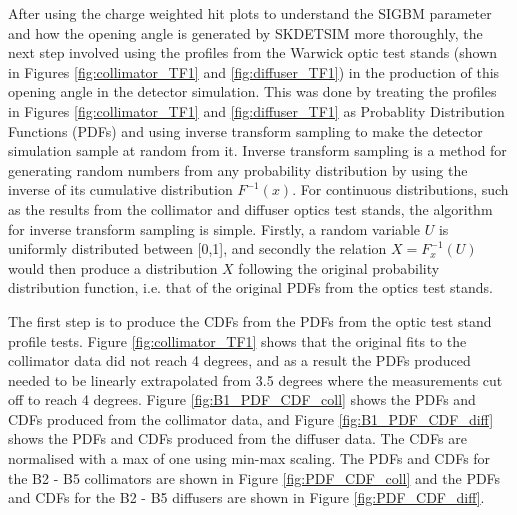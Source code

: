 After using the charge weighted hit plots to understand the SIGBM parameter and how the opening angle is generated by SKDETSIM more thoroughly, the next step involved using the profiles from the Warwick optic test stands (shown in Figures \ref{fig:collimator_TF1} and \ref{fig:diffuser_TF1}) in the production of this opening angle in the detector simulation. This was done by treating the profiles in Figures \ref{fig:collimator_TF1} and \ref{fig:diffuser_TF1} as Probablity Distribution Functions (PDFs) and using inverse transform sampling to make the detector simulation sample at random from it. Inverse transform sampling is a method for generating random numbers from any probability distribution by using the inverse of its cumulative distribution $F^{-1}(x)$. For continuous distributions, such as the results from the collimator and diffuser optics test stands, the algorithm for inverse transform sampling is simple. Firstly, a random variable $U$ is uniformly distributed between [0,1], and secondly the relation $X = F^{-1}_{x}(U)$ would then produce a distribution $X$ following the original probability distribution function, i.e. that of the original PDFs from the optics test stands. 

The first step is to produce the CDFs from the PDFs from the optic test stand profile tests. Figure \ref{fig:collimator_TF1} shows that the original fits to the collimator data did not reach 4 degrees, and as a result the PDFs produced needed to be linearly extrapolated from 3.5 degrees where the measurements cut off to reach 4 degrees. Figure \ref{fig:B1_PDF_CDF_coll} shows the PDFs and CDFs produced from the collimator data, and Figure \ref{fig:B1_PDF_CDF_diff} shows the PDFs and CDFs produced from the diffuser data. The CDFs are normalised with a max of one using min-max scaling. The PDFs and CDFs for the B2 - B5 collimators are shown in Figure \ref{fig:PDF_CDF_coll} and the PDFs and CDFs for the B2 - B5 diffusers are shown in Figure \ref{fig:PDF_CDF_diff}.


